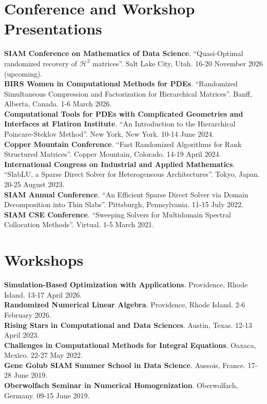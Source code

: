 \documentclass[10pt,margin]{res}
\newcommand{\workshop}[3]{%
  \textbf{#1}.\space%
  #2. #3.\\[0.4em]%
}
\newcommand{\condensed}[2]{%
  \textbf{#1}.{#2}\\[0.4em]%
}
\begin{document}
\begin{resume}
\section{Conference and Workshop Presentations}
  \condensed{SIAM Conference on Mathematics of Data Science}{
  ``Quasi-Optimal randomized recovery of $\mathcal{H}^2$ matrices''.
  Salt Lake City, Utah. 16-20 November 2026 (upcoming).}
  \condensed{BIRS Women in Computational Methods for PDEs}{
  ``Randomized Simultaneous Compression and Factorization for Hierarchical Matrices''.
  Banff, Alberta, Canada. 1-6 March 2026.}
  \condensed{Computational Tools for PDEs with Complicated Geometries and Interfaces at Flatiron Institute}{
  ``An Introduction to the Hierarchical Poincare-Steklov Method''.
  New York, New York. 10-14 June 2024.}
  \condensed{Copper Mountain Conference}{
  ``Fast Randomized Algorithms for Rank Structured Matrices''.
  Copper Mountain, Colorado. 14-19 April 2024.}
  \condensed{International Congress on Industrial and Applied Mathematics}{
  ``SlabLU, a Sparse Direct Solver for Heterogeneous Architectures''.
  Tokyo, Japan. 20-25 August 2023.}
  \condensed{SIAM Annual Conference}{
  ``An Efficient Sparse Direct Solver via Domain Decomposition into Thin Slabs''.
  Pittsburgh, Pennsylvania. 11-15 July 2022.}
  \condensed{SIAM CSE Conference}{
  ``Sweeping Solvers for Multidomain Spectral Collocation Methods''.
  Virtual. 1-5 March 2021.}

  \vspace{-2em}

\section{Workshops}
\workshop{Simulation-Based Optimization with Applications}
{Providence, Rhode Island}{13-17 April 2026}
\workshop{Randomized Numerical Linear Algebra}
{Providence, Rhode Island}{2-6 February 2026}
\workshop{Rising Stars in Computational and Data Sciences}
{Austin, Texas}{12-13 April 2023}
\workshop{Challenges in Computational Methods for Integral Equations}{Oaxaca, Mexico}{22-27 May 2022}
\workshop{Gene Golub SIAM Summer School in Data Science}
{Aussois, France}{17-28 June 2019}
\workshop{Oberwolfach Seminar in Numerical Homogenization} {Oberwolfach, Germany}{09-15 June 2019}


\end{resume}
\end{document}
